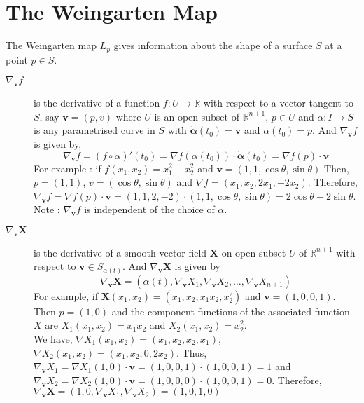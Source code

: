 \section{The Weingarten Map}
	The Weingarten map $L_p$ gives information about the shape of a surface $S$ at a point $p \in S$.
\begin{description}
	\item[$\nabla_{\boldsymbol{v}} f$] is the derivative of a function $f : U \to \mathbb{R}$ with respect to a vector tangent to $S$, say $\boldsymbol{v} = (p,v)$ where $U$ is an open subset of $\mathbb{R}^{n+1}$, $p \in U$ and $\alpha : I \to S$ is any parametrised curve in $S$ with $\dot{\boldsymbol{\alpha}}(t_0) = \boldsymbol{v}$ and $\alpha(t_0) = p$.
		And $\nabla_{\boldsymbol{v}} f$ is given by,
		\[ \nabla_{\boldsymbol{v}} f = (f \circ \alpha)'(t_0) = \nabla f(\alpha(t_0)) \cdot \dot{\boldsymbol{\alpha}}(t_0) = \nabla f(p) \cdot \boldsymbol{v} \]
	For example : if $f(x_1,x_2) = x_1^2 - x_2^2$ and $\boldsymbol{v} = (1,1,\cos \theta, \sin \theta)$ Then, $p = (1,1)$, $v = (\cos \theta, \sin \theta)$ and $\nabla f = (x_1,x_2,2x_1,-2x_2)$.
		Therefore, $\nabla_{\boldsymbol{v}} f = \nabla f(p) \cdot \boldsymbol{v} = (1,1,2,-2) \cdot (1,1,\cos \theta, \sin \theta) = 2\cos \theta -2 \sin \theta $.\\

		Note : $\nabla_{\boldsymbol{v}} f$ is independent of the choice of $\alpha$.

	\item[$\nabla_{\boldsymbol{v}} \boldsymbol{X}$] is the derivative of a smooth vector field $\boldsymbol{X}$ on open subset $U$ of $\mathbb{R}^{n+1}$ with respect to $\boldsymbol{v} \in S_{\alpha(t)}$.
		And $\nabla_{\boldsymbol{v}} \boldsymbol{X}$ is given by
		\[ \nabla_{\boldsymbol{v}} \boldsymbol{X} = \left(\alpha(t),\nabla_{\boldsymbol{v}} X_1, \nabla_{\boldsymbol{v}} X_2,\dots, \nabla_{\boldsymbol{v}} X_{n+1} \right) \]
	For example, if $\boldsymbol{X}(x_1,x_2) = (x_1,x_2,x_1x_2,x_2^2)$ and $\boldsymbol{v} = (1,0,0,1)$.
		Then $p = (1,0)$ and the component functions of the associated function $X$ are $X_1(x_1,x_2) = x_1x_2$ and $X_2(x_1,x_2) = x_2^2$.\\
		
	We have, $\nabla X_1(x_1,x_2) = (x_1,x_2,x_2,x_1)$, $\nabla X_2(x_1,x_2) = (x_1,x_2,0,2x_2)$.
		Thus, $\nabla_{\boldsymbol{v}} X_1 = \nabla X_1(1,0) \cdot \boldsymbol{v} = (1,0,0,1) \cdot (1,0,0,1) = 1$ and\\ $\nabla_{\boldsymbol{v}} X_2 = \nabla X_2(1,0) \cdot \boldsymbol{v} = (1,0,0,0) \cdot (1,0,0,1) = 0$.
		Therefore,\\ $\nabla_{\boldsymbol{v}} \boldsymbol{X} = \left( 1,0,\nabla_{\boldsymbol{v}} X_1,\nabla_{\boldsymbol{v}} X_2 \right) = \left( 1,0,1,0 \right)$


\end{description}
